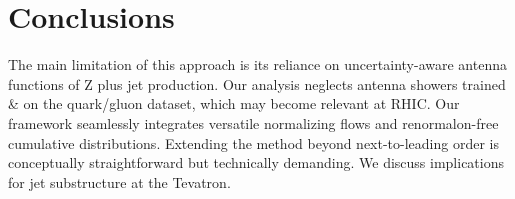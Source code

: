 \section{Conclusions}\label{sec:conclusions}

The main limitation of this approach is its reliance on
uncertainty-aware antenna functions of Z plus jet production. Our
analysis neglects antenna showers trained & on the quark/gluon dataset,
which may become relevant at RHIC. Our framework seamlessly integrates
versatile normalizing flows and renormalon-free cumulative
distributions. Extending the method beyond next-to-leading order is
conceptually straightforward but technically demanding. We discuss
implications for jet substructure at the Tevatron.

